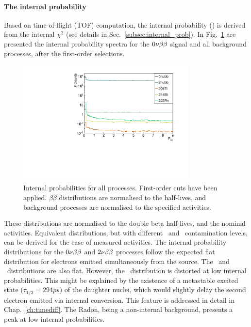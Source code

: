 \paragraph{The internal probability}
Based on time-of-flight (TOF) computation, the internal probability (\Pint) is derived from the internal $\chi^{2}$ (see details in Sec.~\ref{subsec:internal_prob}).
In Fig.~\ref{fig:Pint} are presented the internal probability spectra for the $0\nu\beta\beta$ signal and all background processes, after the first-order selections.
\begin{figure}[h]
  \centering
  \includegraphics[width=0.8\textwidth]{Sensitivity/fig_sensitivity/InternalProbability.pdf}
  \caption{Internal probabilities for all processes.
    First-order cuts have been applied.
    $\beta\beta$ distributions are normalised to the half-lives, and background processes are normalised to the specified activities.
    \label{fig:Pint}}
\end{figure}
These distributions are normalised to the double beta half-lives, and the nominal activities.
Equivalent distributions, but with different \Bi\ and \Tl\ contamination levels, can be derived for the case of measured activities.
The internal probability distributions for the $0\nu\beta\beta$ and $2\nu\beta\beta$ processes follow the expected flat distribution for electrons emitted simultaneously from the source.
The \Tl\ and \Bi\ distributions are also flat.
However, the \Tl\ distribution is distorted at low internal probabilities.
This might be explained by the existence of a metastable excited state ($\tau_{1/2} = 294 ps$) of the daughter nuclei, which would slightly delay the second electron emitted via internal conversion.
This feature is addressed in detail in Chap.~\ref{ch:timediff}.
The Radon, being a non-internal background, presents a peak at low internal probabilities.

